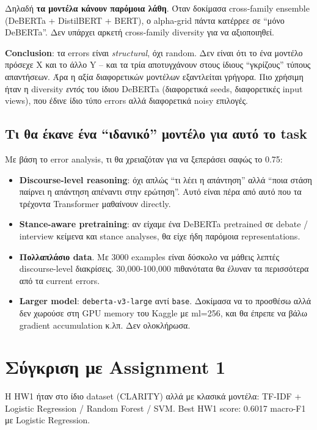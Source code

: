 \documentclass[12pt]{fphw}
\begin{document}
Δηλαδή \textbf{τα μοντέλα κάνουν παρόμοια λάθη}. Όταν δοκίμασα cross-family ensemble (DeBERTa + DistilBERT + BERT), ο alpha-grid πάντα κατέρρεε σε ``μόνο DeBERTa''. Δεν υπάρχει αρκετή cross-family diversity για να αξιοποιηθεί.

\textbf{Conclusion}: τα errors είναι \emph{structural}, όχι random. Δεν είναι ότι το ένα μοντέλο πρόσεχε X και το άλλο Y -- και τα τρία αποτυγχάνουν στους ίδιους ``γκρίζους'' τύπους απαντήσεων. Άρα η αξία διαφορετικών μοντέλων εξαντλείται γρήγορα. Πιο χρήσιμη ήταν η diversity \emph{εντός} του ίδιου DeBERTa (διαφορετικά seeds, διαφορετικές input views), που έδινε ίδιο τύπο errors αλλά διαφορετικά noisy επιλογές.

\subsection{Τι θα έκανε ένα ``ιδανικό'' μοντέλο για αυτό το task}

Με βάση το error analysis, τι θα χρειαζόταν για να ξεπεράσει σαφώς το 0.75:

\begin{itemize}
    \item \textbf{Discourse-level reasoning}: όχι απλώς ``τι λέει η απάντηση'' αλλά ``ποια στάση παίρνει η απάντηση απέναντι στην ερώτηση''. Αυτό είναι πέρα από αυτό που τα τρέχοντα Transformer μαθαίνουν directly.
    \item \textbf{Stance-aware pretraining}: αν είχαμε ένα DeBERTa pretrained σε debate / interview κείμενα και stance analyses, θα είχε ήδη παρόμοια representations.
    \item \textbf{Πολλαπλάσιο data}. Με 3000 examples είναι δύσκολο να μάθεις λεπτές discourse-level διακρίσεις. 30,000-100,000 πιθανότατα θα έλυναν τα περισσότερα από τα current errors.
    \item \textbf{Larger model}: \texttt{deberta-v3-large} αντί \texttt{base}. Δοκίμασα να το προσθέσω αλλά δεν χωρούσε στη GPU memory του Kaggle με ml=256, και θα έπρεπε να βάλω gradient accumulation κ.λπ. Δεν ολοκλήρωσα.
\end{itemize}

\section{Σύγκριση με Assignment 1}

Η HW1 ήταν στο ίδιο dataset (CLARITY) αλλά με κλασικά μοντέλα: TF-IDF + Logistic Regression / Random Forest / SVM. Best HW1 score: 0.6017 macro-F1 με Logistic Regression.
\end{document}
